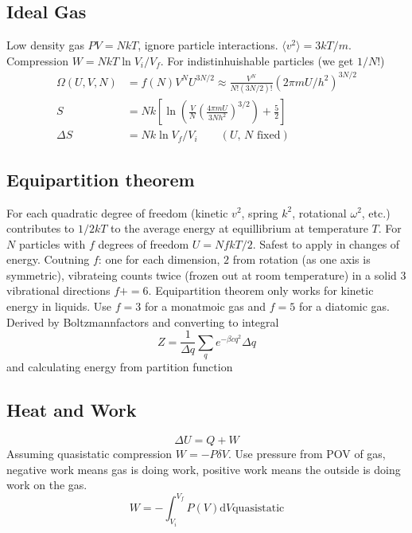 \documentclass[a4paper, norsk, 8pt]{article}
\begin{document}
\begin{multicols*}{3}
\subsection*{\footnotesize  Ideal Gas}
Low density gas $PV=NkT$, ignore particle interactions. $\langle v^2 \rangle = 3kT/m$. Compression $W =NkT\ln{V_i/V_f}$.
For indistinhuishable particles (we get $1/N!$)
\begin{align*}
  \Omega(U, V, N) &= f(N)V^NU^{3N/2} \approx \frac{V^N}{N!(3N/2)!}(2\pi mU/h^2)^{3N/2} \\
  S &= Nk\left[\ln\left( \frac{V}{N}\left( \frac{4\pi m U}{3Nh^2} \right)^{3/2}  \right) + \frac{5}{2}\right] \\
  \Delta S &= Nk\ln{V_f/V_i} \qquad (\text{$U$, $N$ fixed})
\end{align*}


\subsection*{\footnotesize  Equipartition theorem}
For each quadratic degree of freedom (kinetic $v^2$, spring $k^2$, rotational $\omega^2$, etc.) contributes to $1/2kT$ to the average energy at equillibrium at temperature $T$. For $N$ particles with $f$ degrees of freedom $U = NfkT/2$. Safest to apply in changes of energy. Coutning $f$: one for each dimension, $2$ from rotation (as one axis is symmetric), vibrateing counts twice (frozen out at room temperature) in a solid $3$ vibrational directions $f+=6$. Equipartition theorem only works for kinetic energy in liquids. Use $f=3$ for a monatmoic gas and $f=5$ for a diatomic gas.\\
Derived by Boltzmannfactors and converting to integral
\begin{equation*}
    Z = \frac{1}{\Delta q}\sum_q e^{-\beta c q^2}\Delta q
\end{equation*}
and calculating energy from partition function
\subsection*{\footnotesize  Heat and Work}
\begin{equation}
  \Delta U = Q + W
\end{equation}
Assuming quasistatic compression $W = -P\delta V$. Use pressure from POV of gas, negative work means gas is doing work, positive work means the outside is doing work on the gas.
\begin{equation*}
  W = -\int_{V_i}^{V_f}P(V) \mbox{d} V \text{quasistatic}
\end{equation*}


\end{multicols*}
\end{document}
